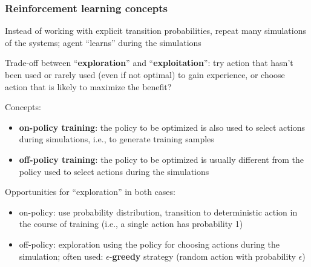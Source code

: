 \documentclass[t]{beamer}
\begin{document}
\begin{frame}
\frametitle{Reinforcement learning concepts}
Instead of working with explicit transition probabilities, repeat many simulations of the systems; agent ``learns'' during the simulations

Trade-off between ``\textbf{exploration}'' and ``\textbf{exploitation}'': try action that hasn't been used or rarely used (even if not optimal) to gain experience, or choose action that is likely to maximize the benefit?

Concepts:\\
\begin{itemize}
\item \textbf{on-policy training}: the policy to be optimized is also used to select actions during simulations, i.e., to generate training samples
\item \textbf{off-policy training}: the policy to be optimized is usually different from the policy used to select actions during the simulations
\end{itemize}

Opportunities for ``exploration'' in both cases:\\
\begin{itemize}
\item on-policy: use probability distribution, transition to deterministic action in the course of training (i.e., a single action has probability 1)
\item off-policy: exploration using the policy for choosing actions during the simulation; often used: $\epsilon$-\textbf{greedy} strategy (random action with probability $\epsilon$)
\end{itemize}
\end{frame}
\end{document}
